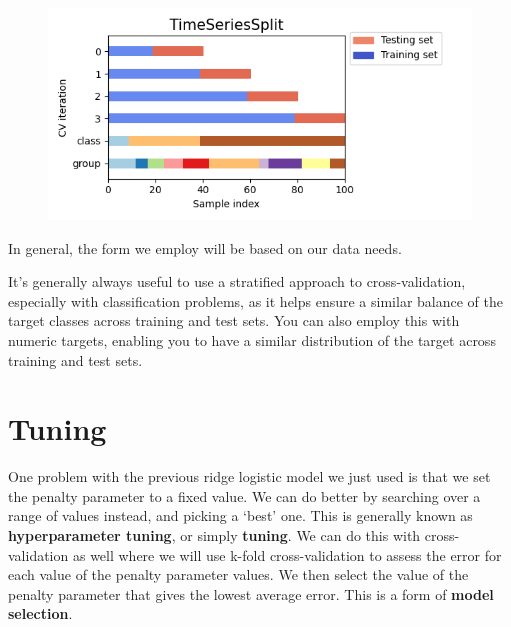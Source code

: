 \documentclass[
  letterpaper,
]{krantz}
\begin{document}
\begin{figure}
\begin{minipage}{0.50\linewidth}
\end{minipage}%
%
\begin{minipage}{0.50\linewidth}

\includegraphics{img/sklearn_k_fold_images/time_series.png}

\end{minipage}%

\end{figure}%

In general, the form we employ will be based on our data needs.

\begin{tcolorbox}[enhanced jigsaw, opacityback=0, leftrule=.75mm, bottomrule=.15mm, colframe=quarto-callout-tip-color-frame, rightrule=.15mm, breakable, left=2mm, colback=white, arc=.35mm, toprule=.15mm]

It's generally always useful to use a stratified approach to
cross-validation, especially with classification problems, as it helps
ensure a similar balance of the target classes across training and test
sets. You can also employ this with numeric targets, enabling you to
have a similar distribution of the target across training and test sets.

\end{tcolorbox}

\section{Tuning}\label{sec-ml-tuning}

One problem with the previous ridge logistic model we just used is that
we set the penalty parameter to a fixed value. We can do better by
searching over a range of values instead, and picking a `best' one. This
is generally known as \textbf{hyperparameter tuning}, or simply
\textbf{tuning}. We can do this with cross-validation as well where we
will use k-fold cross-validation to assess the error for each value of
the penalty parameter values. We then select the value of the penalty
parameter that gives the lowest average error. This is a form of
\textbf{model selection}.
\end{document}
